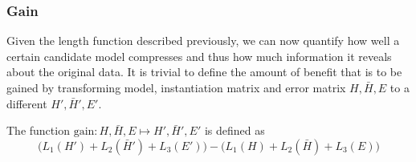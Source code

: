 \documentclass{llncs}
\begin{document}
\subsubsection{Gain}

Given the length function described previously, we can now quantify how well a certain candidate model compresses and thus how much information it reveals about the original data. It is trivial to define the amount of benefit that is to be gained by transforming model, instantiation matrix and error matrix $H,\bar{H},E$ to a different $H',\bar{H}',E'$.

\begin{definition}
The function $\mathrm{gain}: H,\bar{H},E \mapsto H',\bar{H}',E'$ is defined as
$$
\Big(L_1(H') + L_2(\bar{H}') + L_3(E')\Big) - \Big(L_1(H) + L_2(\bar{H}) + L_3(E)\Big)
$$
\end{definition}
\end{document}
